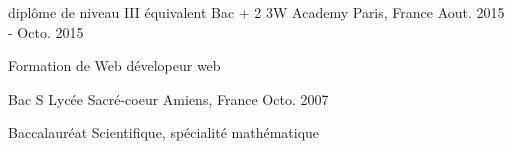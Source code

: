 

\begin{cventries}

  \cventry
    {diplôme de niveau III équivalent Bac + 2} %
    {3W Academy} %
    {Paris, France} %
    {Aout. 2015 - Octo. 2015} %
    {
      \begin{cvitems} %
        \item {Formation de Web dévelopeur web}
      \end{cvitems}
    }

\cventry
{Bac S} %
{Lycée Sacré-coeur} %
{Amiens, France} %
{Octo. 2007} %
{
  \begin{cvitems} %
    \item {Baccalauréat Scientifique, spécialité mathématique}
  \end{cvitems}
}

\end{cventries}
